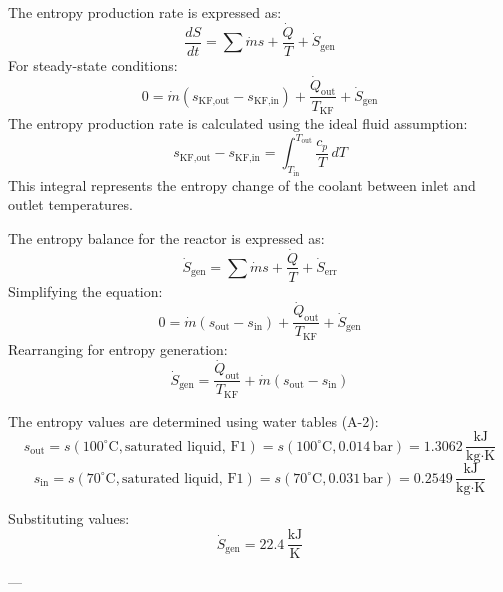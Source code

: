 The entropy production rate is expressed as:  
\[
\frac{dS}{dt} = \sum \dot{m} s + \frac{\dot{Q}}{T} + \dot{S}_{\text{gen}}
\]  
For steady-state conditions:  
\[
0 = \dot{m} (s_{\text{KF,out}} - s_{\text{KF,in}}) + \frac{\dot{Q}_{\text{out}}}{T_{\text{KF}}} + \dot{S}_{\text{gen}}
\]  
The entropy production rate is calculated using the ideal fluid assumption:  
\[
s_{\text{KF,out}} - s_{\text{KF,in}} = \int_{T_{\text{in}}}^{T_{\text{out}}} \frac{c_p}{T} \, dT
\]  
This integral represents the entropy change of the coolant between inlet and outlet temperatures.

The entropy balance for the reactor is expressed as:  
\[
\dot{S}_{\text{gen}} = \sum \dot{m} s + \frac{\dot{Q}}{T} + \dot{S}_{\text{err}}
\]  
Simplifying the equation:  
\[
0 = \dot{m} (s_{\text{out}} - s_{\text{in}}) + \frac{\dot{Q}_{\text{out}}}{T_{\text{KF}}} + \dot{S}_{\text{gen}}
\]  
Rearranging for entropy generation:  
\[
\dot{S}_{\text{gen}} = \frac{\dot{Q}_{\text{out}}}{T_{\text{KF}}} + \dot{m} (s_{\text{out}} - s_{\text{in}})
\]  

The entropy values are determined using water tables (A-2):  
\[
s_{\text{out}} = s(100^\circ\text{C}, \text{saturated liquid, F1}) = s(100^\circ\text{C}, 0.014 \, \text{bar}) = 1.3062 \, \frac{\text{kJ}}{\text{kg·K}}
\]  
\[
s_{\text{in}} = s(70^\circ\text{C}, \text{saturated liquid, F1}) = s(70^\circ\text{C}, 0.031 \, \text{bar}) = 0.2549 \, \frac{\text{kJ}}{\text{kg·K}}
\]  

Substituting values:  
\[
\dot{S}_{\text{gen}} = 22.4 \, \frac{\text{kJ}}{\text{K}}
\]  

---